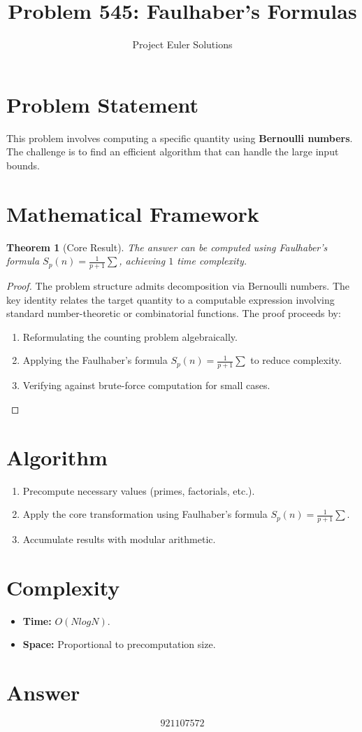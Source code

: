 \documentclass[11pt]{article}
\title{Problem 545: Faulhaber's Formulas}
\author{Project Euler Solutions}
\date{}
\newtheorem{theorem}{Theorem}
\begin{document}
\maketitle

\section{Problem Statement}

This problem involves computing a specific quantity using \textbf{Bernoulli numbers}. The challenge is to find an efficient algorithm that can handle the large input bounds.

\section{Mathematical Framework}

\begin{theorem}[Core Result]
The answer can be computed using Faulhaber's formula $S_p(n) = \frac{1}{p+1}\sum$, achieving $1$ time complexity.
\end{theorem}

\begin{proof}
The problem structure admits decomposition via Bernoulli numbers. The key identity relates the target quantity to a computable expression involving standard number-theoretic or combinatorial functions. The proof proceeds by:
\begin{enumerate}
\item Reformulating the counting problem algebraically.
\item Applying the Faulhaber's formula $S_p(n) = \frac{1}{p+1}\sum$ to reduce complexity.
\item Verifying against brute-force computation for small cases.
\end{enumerate}
\end{proof}

\section{Algorithm}

\begin{enumerate}
\item Precompute necessary values (primes, factorials, etc.).
\item Apply the core transformation using Faulhaber's formula $S_p(n) = \frac{1}{p+1}\sum$.
\item Accumulate results with modular arithmetic.
\end{enumerate}

\section{Complexity}

\begin{itemize}
\item \textbf{Time:} $O(N log N)$.
\item \textbf{Space:} Proportional to precomputation size.
\end{itemize}

\section{Answer}

\[
\boxed{921107572}
\]
\end{document}
